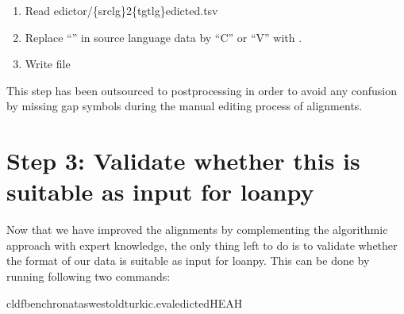 \documentclass[letterpaper,10pt,english]{sphinxmanual}
\begin{document}
{{{{\begin{fulllineitems}
\end{fulllineitems}


\begin{fulllineitems}
\label{\detokenize{mkedictor:ronataswestoldturkiccommands.cvgapedicted.run}}
\pysigstartsignatures
{}
\pysigstopsignatures\begin{enumerate}
%
\item {} 
\sphinxAtStartPar
Read edictor/\{srclg\}2\{tgtlg\}edicted.tsv

\item {} 
\sphinxAtStartPar
Replace “\sphinxhyphen{}” in source language data by “C” or “V” with
.

\item {} 
\sphinxAtStartPar
Write file

\end{enumerate}

\end{fulllineitems}


\sphinxAtStartPar
This step has been outsourced to post\sphinxhyphen{}processing in order to avoid any
confusion by missing gap symbols during the manual editing process of
alignments.


\section{Step 3: Validate whether this is suitable as input for loanpy}
\label{\detokenize{mkedictor:step-3-validate-whether-this-is-suitable-as-input-for-loanpy}}
\sphinxAtStartPar
Now that we have improved the alignments by complementing the algorithmic
approach with expert knowledge, the only thing left to do is to validate
whether the format of our data is suitable as input for loanpy. This can be
done by running following two commands:

\begin{sphinxVerbatim}[commandchars=\\\{\}]
cldfbenchronataswestoldturkic.evaledictedHEAH
\end{sphinxVerbatim}

}}}}
\end{document}

